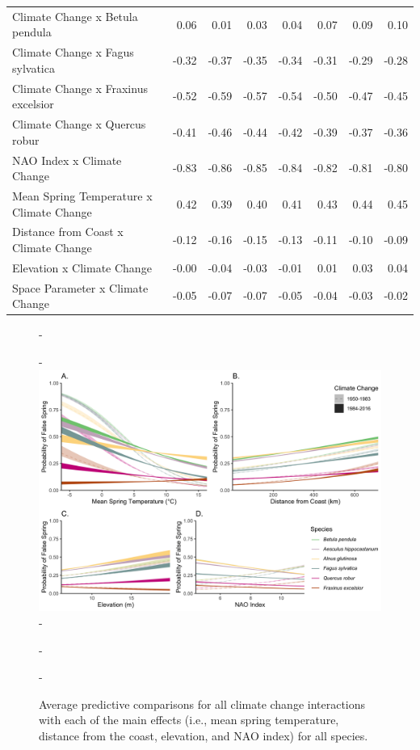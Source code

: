 \documentclass{article}\usepackage[]{graphicx}\usepackage[]{color}
\begin{document}
\begin{longtable}{lrrrrrrr}
  Climate Change
x Betula pendula & 0.06 & 0.01 & 0.03 & 0.04 & 0.07 & 0.09 & 0.10 \\ 
  Climate Change
x Fagus sylvatica & -0.32 & -0.37 & -0.35 & -0.34 & -0.31 & -0.29 & -0.28 \\ 
  Climate Change
x Fraxinus excelsior & -0.52 & -0.59 & -0.57 & -0.54 & -0.50 & -0.47 & -0.45 \\ 
  Climate Change
x Quercus robur & -0.41 & -0.46 & -0.44 & -0.42 & -0.39 & -0.37 & -0.36 \\ 
  NAO Index x Climate Change & -0.83 & -0.86 & -0.85 & -0.84 & -0.82 & -0.81 & -0.80 \\ 
  Mean Spring 
Temperature x Climate Change & 0.42 & 0.39 & 0.40 & 0.41 & 0.43 & 0.44 & 0.45 \\ 
  Distance from 
Coast x Climate Change & -0.12 & -0.16 & -0.15 & -0.13 & -0.11 & -0.10 & -0.09 \\ 
  Elevation x Climate Change & -0.00 & -0.04 & -0.03 & -0.01 & 0.01 & 0.03 & 0.04 \\ 
  Space Parameter x Climate Change & -0.05 & -0.07 & -0.07 & -0.05 & -0.04 & -0.03 & -0.02 \\ 
   \hline
\hline
\end{longtable}



{\begin{figure} [H]
  -\begin{center}
  -\includegraphics[width=16cm]{..//analyses/figures/APC_allpred_allspp_baseR_98.png}
  -\caption{Average predictive comparisons for all climate change interactions with each of the main effects (i.e., mean spring temperature, distance from the coast, elevation, and NAO index) for all species. }\label{fig:suppapc}
  -\end{center}
  -\end{figure}}
  
\end{document}
